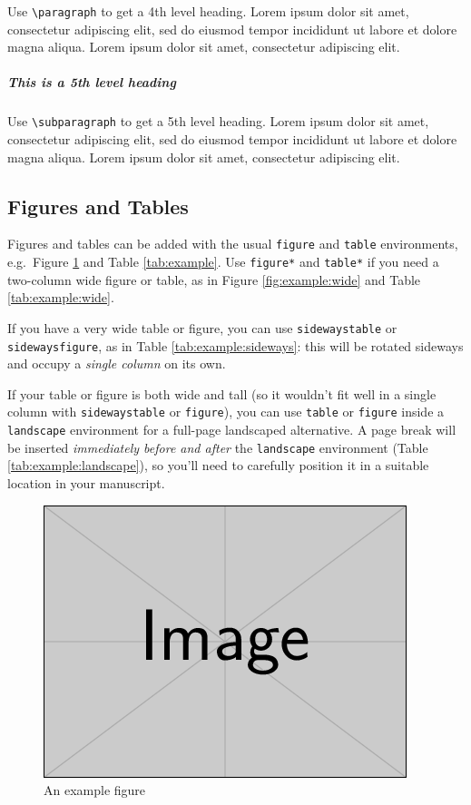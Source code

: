 \documentclass[a4paper,num-refs]{oup-contemporary}
\begin{document}
Use \verb|\paragraph| to get a 4th level heading.
Lorem ipsum dolor sit amet, consectetur adipiscing elit, sed do eiusmod tempor incididunt ut labore et dolore magna aliqua. Lorem ipsum dolor sit amet, consectetur adipiscing elit. 

\subparagraph{This is a 5th level heading}

Use \verb|\subparagraph| to get a 5th level heading.
Lorem ipsum dolor sit amet, consectetur adipiscing elit, sed do eiusmod tempor incididunt ut labore et dolore magna aliqua. Lorem ipsum dolor sit amet, consectetur adipiscing elit.


\subsection{Figures and Tables}
Figures and tables can be added with the usual \verb|figure| and \verb|table| environments, e.g.~Figure \ref{fig:example} and Table \ref{tab:example}. Use \verb|figure*| and \verb|table*| if you need a two-column wide figure or table, as in Figure \ref{fig:example:wide} and Table \ref{tab:example:wide}. 

If you have a very wide table or figure, you can use \texttt{sidewaystable} or \texttt{sidewaysfigure}, as in Table \ref{tab:example:sideways}: this will be rotated sideways and occupy a \emph{single column} on its own.

If your table or figure is both wide and tall (so it wouldn't fit well in a single column with \texttt{sidewaystable} or \texttt{figure}), 
you can use \verb|table| or \verb|figure| inside a \verb|landscape| environment for a full-page landscaped alternative. A page break will be inserted \emph{immediately before and after} the \verb|landscape| environment (Table \ref{tab:example:landscape}), so you'll need to carefully position it in a suitable location in your manuscript.

\begin{figure}[bt!] %
\centering
\includegraphics[width=\linewidth]{example-image}
\caption{An example figure}\label{fig:example}
\end{figure}
\end{document}

